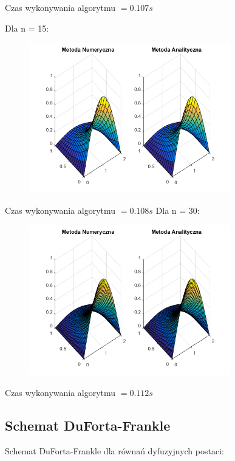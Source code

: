 Czas wykonywania algorytmu $ = 0.107 s$

Dla n = 15:

\begin{figure}[!ht]
	\begin{center}
		\includegraphics[width=0.78\textwidth]{Lab7/charts/cn/15.png}
	\end{center}
\end{figure}

Czas wykonywania algorytmu $ = 0.108 s$
\newpage
Dla n = 30:

\begin{figure}[!ht]
	\begin{center}
		\includegraphics[width=0.78\textwidth]{Lab7/charts/cn/30.png}
	\end{center}
\end{figure}

Czas wykonywania algorytmu $ = 0.112 s$

\subsection{Schemat DuForta-Frankle}
Schemat DuForta-Frankle dla równań dyfuzyjnych postaci:

